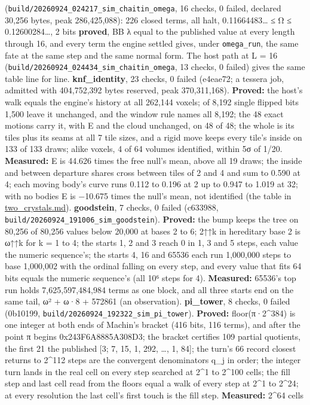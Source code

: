\begin{description}
(\texttt{build/\allowbreak{}20260924\_\allowbreak{}024217\_\allowbreak{}sim\_\allowbreak{}chaitin\_\allowbreak{}omega}, 16 checks, 0 failed, declared 30,256 bytes, peak 286,425,088): 226 closed terms, all halt, 0.11664483… ≤ Ω ≤ 0.12600284…, 2 bits \textbf{proved}, BB λ equal to the published value at every length through 16, and every term the engine settled gives, under \texttt{omega\_\allowbreak{}run}, the same fate at the same step and the same normal form. The host path at L = 16 (\texttt{build/\allowbreak{}20260924\_\allowbreak{}024434\_\allowbreak{}sim\_\allowbreak{}chaitin\_\allowbreak{}omega}, 13 checks, 0 failed) gives the same table line for line. \textbf{knf\_\allowbreak{}identity}, 23 checks, 0 failed (e4eae72; a tessera job, admitted with 404,752,392 bytes reserved, peak 370,311,168). \textbf{Proved:} the host's walk equals the engine's history at all 262,144 voxels; of 8,192 single flipped bits 1,500 leave it unchanged, and the window rule names all 8,192; the 48 exact motions carry it, with E and the cloud unchanged, on 48 of 48; the whole is its tiles plus its seams at all 7 tile sizes, and a rigid move keeps every tile's inside on 133 of 133 draws; alike voxels, 4 of 64 volumes identified, within 5σ of 1/20. \textbf{Measured:} E is 44.626 times the free null's mean, above all 19 draws; the inside and between departure shares cross between tiles of 2 and 4 and sum to 0.590 at 4; each moving body's curve runs 0.112 to 0.196 at 2 up to 0.947 to 1.019 at 32; with no bodies E is −10.675 times the null's mean, not identified (the table in \hyperref[chap:two-crystals]{two\_\allowbreak{}crystals.md}). \textbf{goodstein}, 7 checks, 0 failed (c633988, \texttt{build/\allowbreak{}20260924\_\allowbreak{}191006\_\allowbreak{}sim\_\allowbreak{}goodstein}). \textbf{Proved:} the bump keeps the tree on 80,256 of 80,256 values below 20,000 at bases 2 to 6; 2↑↑k in hereditary base 2 is ω↑↑k for k = 1 to 4; the starts 1, 2 and 3 reach 0 in 1, 3 and 5 steps, each value the numeric sequence's; the starts 4, 16 and 65536 each run 1,000,000 steps to base 1,000,002 with the ordinal falling on every step, and every value that fits 64 bits equals the numeric sequence's (all 10⁶ steps for 4). \textbf{Measured:} 65536's top run holds 7,625,597,484,984 terms as one block, and all three starts end on the same tail, ω² + ω·8 + 572861 (an observation). \textbf{pi\_\allowbreak{}tower}, 8 checks, 0 failed (0b10199, \texttt{build/\allowbreak{}20260924\_\allowbreak{}192322\_\allowbreak{}sim\_\allowbreak{}pi\_\allowbreak{}tower}). \textbf{Proved:} floor(π·2\textasciicircum{}384) is one integer at both ends of Machin's bracket (416 bits, 116 terms), and after the point π begins 0x243F6A8885A308D3; the bracket certifies 109 partial quotients, the first 21 the published [3; 7, 15, 1, 292, …, 1, 84]; the turn's 66 record closest returns to 2\textasciicircum{}112 steps are the convergent denominators q\_\allowbreak{}j in order; the integer turn lands in the real cell on every step searched at 2\textasciicircum{}1 to 2\textasciicircum{}100 cells; the fill step and last cell read from the floors equal a walk of every step at 2\textasciicircum{}1 to 2\textasciicircum{}24; at every resolution the last cell's first touch is the fill step. \textbf{Measured:} 2\textasciicircum{}64 cells 
\end{description}
